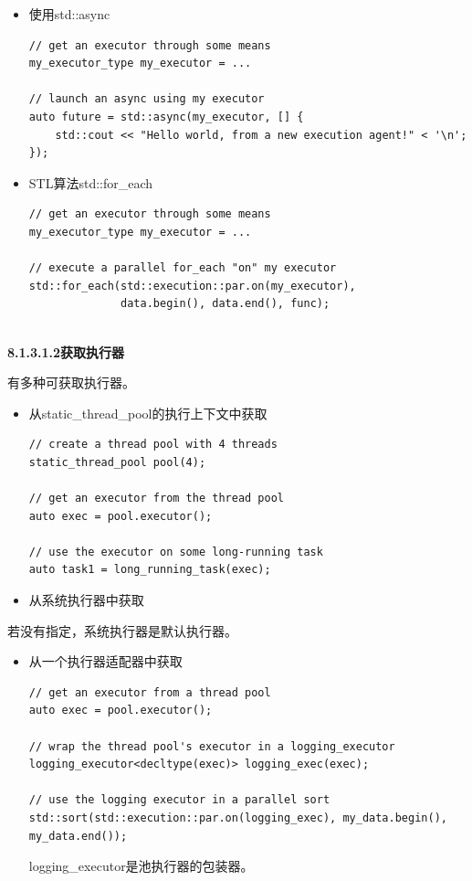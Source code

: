 \begin{itemize}
\item 
使用std::async

\begin{lstlisting}[style=styleCXX]
// get an executor through some means
my_executor_type my_executor = ...

// launch an async using my executor
auto future = std::async(my_executor, [] {
	std::cout << "Hello world, from a new execution agent!" < '\n';
});
\end{lstlisting}

\item 
STL算法std::for\_each

\begin{lstlisting}[style=styleCXX]
// get an executor through some means
my_executor_type my_executor = ...

// execute a parallel for_each "on" my executor
std::for_each(std::execution::par.on(my_executor),
			  data.begin(), data.end(), func);
\end{lstlisting}
\end{itemize}

\hspace*{\fill} \\ %
\noindent
\textbf{8.1.3.1.2\hspace{0.2cm}获取执行器}

有多种可获取执行器。

\begin{itemize}
\item 
从static\_thread\_pool的执行上下文中获取

\begin{lstlisting}[style=styleCXX]
// create a thread pool with 4 threads
static_thread_pool pool(4);

// get an executor from the thread pool
auto exec = pool.executor();

// use the executor on some long-running task
auto task1 = long_running_task(exec);
\end{lstlisting}

\item 
从系统执行器中获取
\end{itemize}

若没有指定，系统执行器是默认执行器。

\begin{itemize}
\item 
从一个执行器适配器中获取

\begin{lstlisting}[style=styleCXX]
// get an executor from a thread pool
auto exec = pool.executor();

// wrap the thread pool's executor in a logging_executor
logging_executor<decltype(exec)> logging_exec(exec);

// use the logging executor in a parallel sort
std::sort(std::execution::par.on(logging_exec), my_data.begin(), my_data.end());
\end{lstlisting}

logging\_executor是池执行器的包装器。
\end{itemize}

